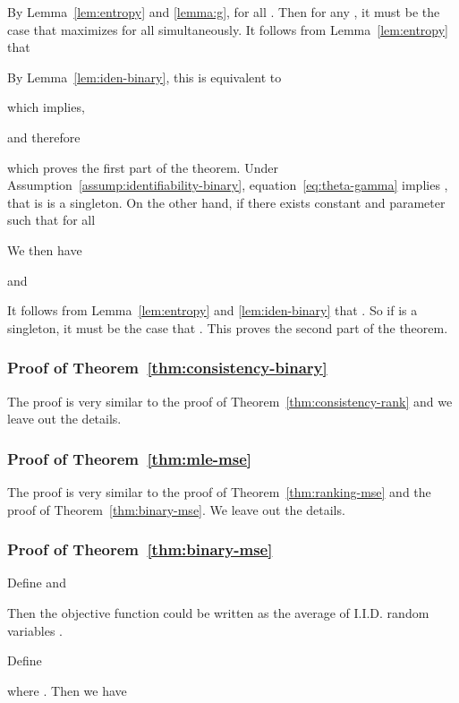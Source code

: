 \documentclass[11pt,a4paper]{article}
\begin{document}
By Lemma~\ref{lem:entropy} and \ref{lemma:g},  for all . 
Then for any , it must be the case that  maximizes  for all  simultaneously. It follows from Lemma~\ref{lem:entropy} that 

By Lemma~\ref{lem:iden-binary}, this is equivalent to 

which implies, 

and therefore

which proves the first part of the theorem. Under Assumption~\ref{assump:identifiability-binary}, equation~\eqref{eq:theta-gamma} implies , that is  is a singleton. On the other hand, if there exists constant  and parameter  such that for all 

We then have  

and  

It follows from Lemma~\ref{lem:entropy} and \ref{lem:iden-binary} that . So if  is a singleton, it must be the case that . This proves the second part of the theorem. 




\subsubsection{Proof of Theorem~\ref{thm:consistency-binary}}
\label{sec:pf-consis-binary}
The proof is very similar to the proof of Theorem~\ref{thm:consistency-rank} and we leave out the details. 


\subsubsection{Proof of Theorem~\ref{thm:mle-mse}}
\label{sec:pf-mle-mse}
The proof is very similar to the proof of Theorem~\ref{thm:ranking-mse} and the proof of Theorem~\ref{thm:binary-mse}. We leave out the details. 






\subsubsection{Proof of Theorem~\ref{thm:binary-mse}}
\label{sec:pf-binary-mse}
Define  and 
 
Then the objective function  could be written as the average of  I.I.D. random variables . 
\begin{small}
  
\end{small}
Define 

where . Then we have 
\end{document}
